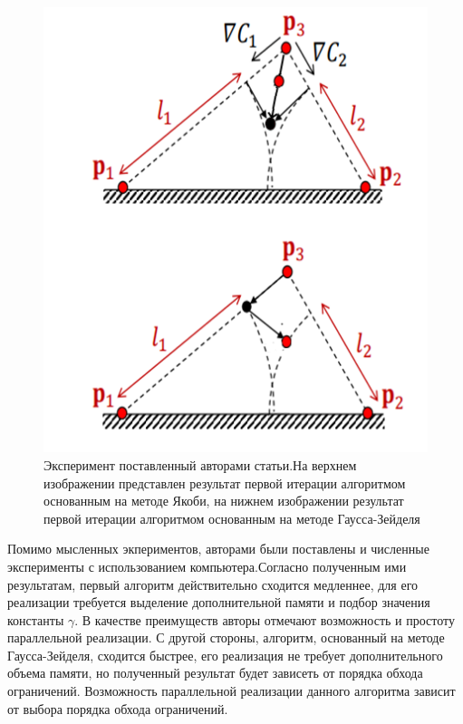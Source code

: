 	\begin{figure}[h!] 
		\center
		\includegraphics [scale=0.65] {my_folder/images//jacobi_vs_gauss}
		\caption{Эксперимент поставленный авторами статьи.\newline На верхнем изображении представлен результат первой итерации алгоритмом основанным на методе Якоби, на нижнем изображении результат первой итерации алгоритмом основанным на методе Гаусса-Зейделя}
		\label{fig:jacobi_vs_gauss}  
	\end{figure}
	
	Помимо мысленных экпериментов, авторами были поставлены и численные эксперименты с использованием компьютера.Согласно полученным ими результатам, первый алгоритм действительно сходится медленнее, для его реализации требуется выделение дополнительной памяти и подбор значения константы $\gamma$. В качестве преимуществ авторы отмечают возможность и простоту параллельной реализации. С другой стороны, алгоритм, основанный на методе Гаусса-Зейделя, сходится быстрее, его реализация не требует дополнительного объема памяти, но полученный результат будет зависеть от порядка обхода ограничений. Возможность параллельной реализации данного алгоритма зависит от выбора порядка обхода ограничений.

%
